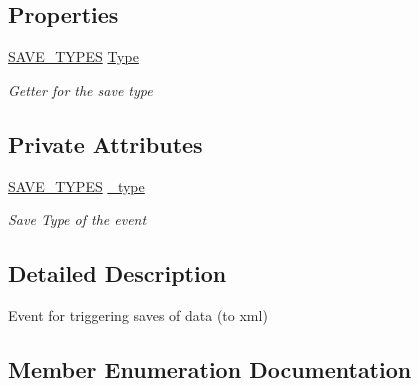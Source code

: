 \subsection*{Properties}
\begin{DoxyCompactItemize}
\item 
\hyperlink{class_web_analyzer_1_1_events_1_1_trigger_save_event_a4eec94af974a1711b6e32010e3e54c0d}{S\+A\+V\+E\+\_\+\+T\+Y\+P\+E\+S} \hyperlink{class_web_analyzer_1_1_events_1_1_trigger_save_event_af54a984dcddf28a5f41eb60d11b3d1b1}{Type}
\begin{DoxyCompactList}\small\item\em Getter for the save type \end{DoxyCompactList}\end{DoxyCompactItemize}
\subsection*{Private Attributes}
\begin{DoxyCompactItemize}
\item 
\hyperlink{class_web_analyzer_1_1_events_1_1_trigger_save_event_a4eec94af974a1711b6e32010e3e54c0d}{S\+A\+V\+E\+\_\+\+T\+Y\+P\+E\+S} \hyperlink{class_web_analyzer_1_1_events_1_1_trigger_save_event_a6aaef578884f9bcf3fd28d999bdb53a3}{\+\_\+type}
\begin{DoxyCompactList}\small\item\em Save Type of the event \end{DoxyCompactList}\end{DoxyCompactItemize}


\subsection{Detailed Description}
Event for triggering saves of data (to xml) 



\subsection{Member Enumeration Documentation}
\hypertarget{class_web_analyzer_1_1_events_1_1_trigger_save_event_a4eec94af974a1711b6e32010e3e54c0d}{}
